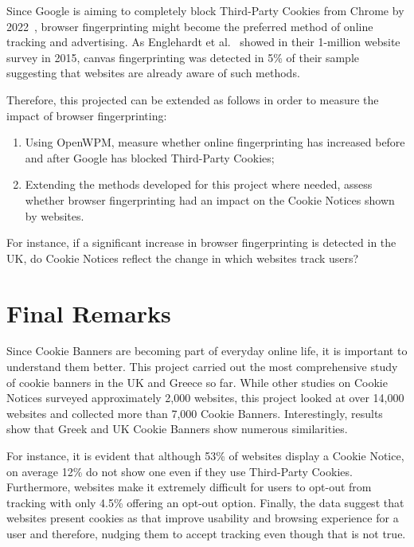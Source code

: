 \documentclass[../main.tex]{subfiles}
\begin{document}
Since Google is aiming to completely block Third-Party Cookies from Chrome by 2022~\cite{bohn_2020}, browser fingerprinting might become the preferred method of online tracking and advertising. As Englehardt et al.~\cite{englehardt2016online} showed in their 1-million website survey in 2015, canvas fingerprinting was detected in 5\% of their sample suggesting that websites are already aware of such methods. 

Therefore, this projected can be extended as follows in order to measure the impact of browser fingerprinting:

\begin{enumerate}
    \item Using OpenWPM, measure whether online fingerprinting has increased before and after Google has blocked Third-Party Cookies;

    \item Extending the methods developed for this project where needed, assess whether browser fingerprinting had an impact on the Cookie Notices shown by websites.
\end{enumerate}

For instance, if a significant increase in browser fingerprinting is detected in the UK, do Cookie Notices reflect the change in which websites track users? 

\section{Final Remarks}
Since Cookie Banners are becoming part of everyday online life, it is important to understand them better. This project carried out the most comprehensive study of cookie banners in the UK and Greece so far. While other studies on Cookie Notices surveyed approximately 2,000 websites, this project looked at over 14,000 websites and collected more than 7,000 Cookie Banners. Interestingly, results show that Greek and UK Cookie Banners show numerous similarities. 

For instance, it is evident that although 53\% of websites display a Cookie Notice, on average 12\% do not show one even if they use Third-Party Cookies. Furthermore, websites make it extremely difficult for users to opt-out from tracking with only 4.5\% offering an opt-out option. Finally, the data suggest that websites present cookies as  that improve usability and browsing experience for a user and therefore, nudging them to accept tracking even though that is not true.
\end{document}
